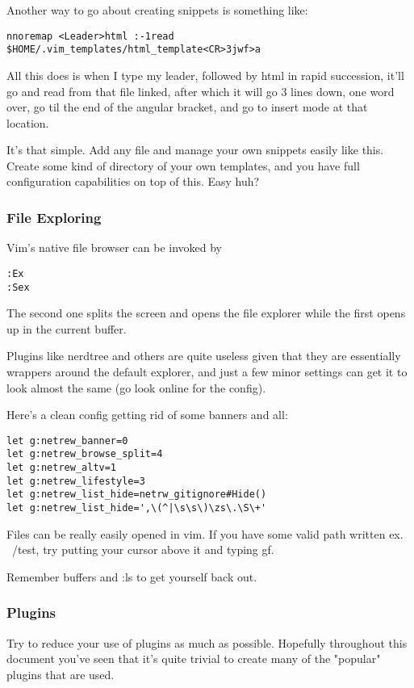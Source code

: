 \documentclass[12pt, letterpaper]{article}
\begin{document}
Another way to go about creating snippets is something like:
\begin{verbatim}
nnoremap <Leader>html :-1read $HOME/.vim_templates/html_template<CR>3jwf>a
\end{verbatim}
All this does is when I type my leader, followed by html in rapid succession, it'll go and read from that file linked, after which it will go 3 lines down, one word over, go til the end of the angular bracket, and go to insert mode at that location.

It's that simple. Add any file and manage your own snippets easily like this. Create some kind of directory of your own templates, and you have full configuration capabilities on top of this. Easy huh?

\subsubsection{File Exploring}
Vim's native file browser can be invoked by
\begin{verbatim}
:Ex
:Sex
\end{verbatim}

The second one splits the screen and opens the file explorer while the first opens up in the current buffer.

Plugins like nerdtree and others are quite useless given that they are essentially wrappers around the default explorer, and just a few minor settings can get it to look almost the same (go look online for the config).

Here's a clean config getting rid of some banners and all:
\begin{verbatim}
let g:netrew_banner=0
let g:netrew_browse_split=4
let g:netrew_altv=1
let g:netrew_lifestyle=3
let g:netrew_list_hide=netrw_gitignore#Hide()
let g:netrew_list_hide=',\(^|\s\s\)\zs\.\S\+'
\end{verbatim}

Files can be really easily opened in vim.
If you have some valid path written ex. ~/test, try putting your cursor above it and typing gf.

Remember buffers and :ls to get yourself back out.

\subsubsection{Plugins}
Try to reduce your use of plugins as much as possible. Hopefully throughout this document you've seen that it's quite trivial to create many of the "popular" plugins that are used. 
\end{document}
